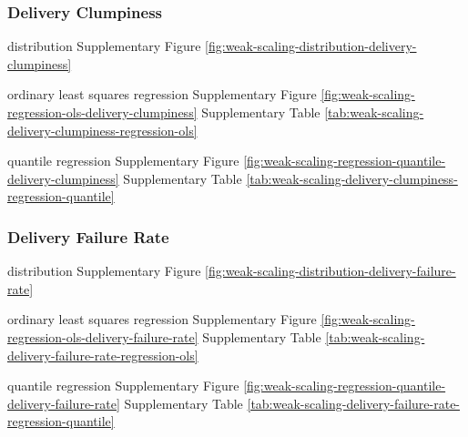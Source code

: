 \subsubsection{Delivery Clumpiness}

distribution Supplementary Figure \ref{fig:weak-scaling-distribution-delivery-clumpiness}

ordinary least squares regression Supplementary Figure \ref{fig:weak-scaling-regression-ols-delivery-clumpiness} Supplementary Table \ref{tab:weak-scaling-delivery-clumpiness-regression-ols}

quantile regression Supplementary Figure \ref{fig:weak-scaling-regression-quantile-delivery-clumpiness}
Supplementary Table \ref{tab:weak-scaling-delivery-clumpiness-regression-quantile}


\subsubsection{Delivery Failure Rate}

distribution Supplementary Figure \ref{fig:weak-scaling-distribution-delivery-failure-rate}

ordinary least squares regression Supplementary Figure \ref{fig:weak-scaling-regression-ols-delivery-failure-rate} Supplementary Table \ref{tab:weak-scaling-delivery-failure-rate-regression-ols}

quantile regression Supplementary Figure \ref{fig:weak-scaling-regression-quantile-delivery-failure-rate}
Supplementary Table \ref{tab:weak-scaling-delivery-failure-rate-regression-quantile}
